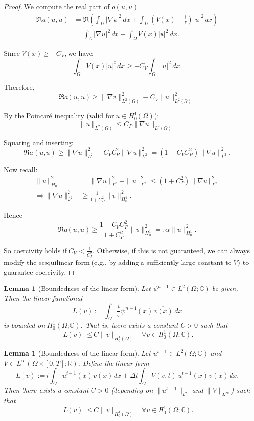 \documentclass{article}
\theoremstyle{definition}
\theoremstyle{plain}
\newtheorem{lemma}[definition]{Lemma}
\theoremstyle{remark}
\begin{document}
\begin{proof}
We compute the real part of $a(u,u)$:
\begin{align*}
\Re a(u, u)
&= \Re \left( \int_\Omega |\nabla u|^2 \, dx + \int_\Omega \left(V(x) + \frac{i}{\tau} \right) |u|^2 \, dx \right) \\
&= \int_\Omega |\nabla u|^2 \, dx + \int_\Omega V(x) |u|^2 \, dx.
\end{align*}

Since \( V(x) \geq -C_V \), we have:
\[
\int_\Omega V(x) |u|^2 \, dx \geq - C_V \int_\Omega |u|^2 \, dx.
\]

Therefore,
\[
\Re a(u, u) \geq \|\nabla u\|_{L^2(\Omega)}^2 - C_V \|u\|_{L^2(\Omega)}^2.
\]

By the Poincaré inequality (valid for \( u \in H_0^1(\Omega) \)):
\[
\|u\|_{L^2(\Omega)} \leq C_P \|\nabla u\|_{L^2(\Omega)}.
\]

Squaring and inserting:
\[
\Re a(u, u) \geq \|\nabla u\|_{L^2}^2 - C_V C_P^2 \|\nabla u\|_{L^2}^2 = \left(1 - C_V C_P^2\right) \|\nabla u\|_{L^2}^2.
\]

Now recall:
\begin{align*}
\|u\|_{H_0^1}^2 &= \|\nabla u\|_{L^2}^2 + \|u\|_{L^2}^2 \leq (1 + C_P^2) \|\nabla u\|_{L^2}^2 \\
\Longrightarrow  \|\nabla u\|_{L^2}^2 &\geq \frac{1}{1 + C_P^2} \|u\|_{H_0^1}^2.
\end{align*}

Hence:
\[
\Re a(u, u) \geq \frac{1 - C_V C_P^2}{1 + C_P^2} \|u\|_{H_0^1}^2 =: \alpha \|u\|_{H_0^1}^2.
\]

So coercivity holds if \( C_V < \frac{1}{C_P^2} \). Otherwise, if this is not guaranteed, we can always modify the sesquilinear form (e.g., by adding a sufficiently large constant to \( V \)) to guarantee coercivity.

\end{proof}

\begin{lemma}[Boundedness of the linear form]
Let $\psi^{n-1} \in L^2(\Omega; \mathbb{C})$ be given. Then the linear functional
\[
L(v) := \int_\Omega \frac{i}{\tau} \psi^{n-1}(x) \, \overline{v(x)} \, dx
\]
is bounded on $H_0^1(\Omega; \mathbb{C})$. That is, there exists a constant $C > 0$ such that
\[
|L(v)| \leq C \|v\|_{H_0^1(\Omega)} \quad \forall v \in H_0^1(\Omega; \mathbb{C}).
\]
\end{lemma}


\begin{lemma}[Boundedness of the linear form]
Let $u^{t-1} \in L^2(\Omega; \mathbb{C})$ and $V \in L^\infty(\Omega \times [0,T]; \mathbb{R})$. Define the linear form
\[
L(v) := i \int_\Omega u^{t-1}(x) \, \overline{v(x)} \, dx + \Delta t \int_\Omega V(x,t) \, u^{t-1}(x) \, \overline{v(x)} \, dx.
\]
Then there exists a constant $C > 0$ (depending on $\|u^{t-1}\|_{L^2}$ and $\|V\|_{L^\infty}$) such that
\[
|L(v)| \leq C \|v\|_{H_0^1(\Omega)} \quad \forall v \in H_0^1(\Omega; \mathbb{C}).
\]
\end{lemma}
\end{document}
